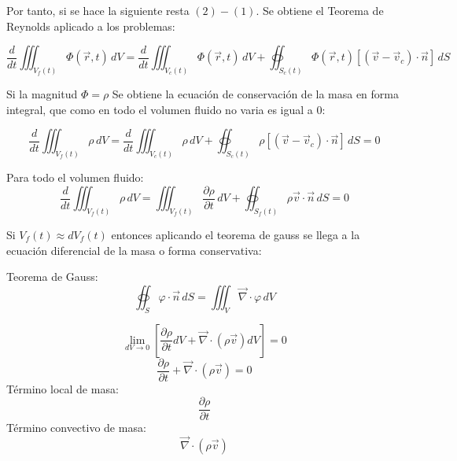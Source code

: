 Por tanto, si se hace la siguiente resta $(2)-(1)$. Se obtiene el Teorema de Reynolds aplicado a los problemas:

\[\frac{d}{dt}\iiint_{V_f(t)}\Phi(\vec{r},t)\,dV=\frac{d}{dt}\iiint_{V_c(t)}\Phi(\vec{r},t)\,dV+\oiint_{S_c(t)} \Phi(\vec{r},t)\left[(\vec{v}-\vec{v}_c)\cdot\vec{n}\right] \,dS\]



Si la magnitud $\Phi = \rho$ Se obtiene la ecuación de conservación de la masa en forma integral, que como en todo el volumen fluido no varia es igual a 0:

\[\frac{d}{dt}\iiint_{V_f(t)}\rho\,dV=\frac{d}{dt}\iiint_{V_c(t)}\rho\,dV+\oiint_{S_c(t)} \rho\left[(\vec{v}-\vec{v}_c)\cdot\vec{n}\right] \,dS=0\]

Para todo el volumen fluido:
\[\frac{d}{dt}\iiint_{V_f(t)} \rho \,dV=\iiint_{V_f(t)} \frac{\partial \rho}{\partial t} \,dV+\oiint_{S_f(t)} \rho\vec{v}\cdot\vec{n} \,dS=0\]

Si $V_f(t)\approx dV_f(t)$ entonces aplicando el teorema de gauss se llega a la ecuación diferencial de la masa o forma conservativa:

Teorema de Gauss:
\[\oiint_S \varphi \cdot \vec{n}\,dS=\iiint_V \vec{\nabla}\cdot\varphi\,dV\]

\[\lim_{dV \to 0}\left[\frac{\partial \rho}{\partial t} dV+\vec{\nabla}\cdot\left(\rho\vec{v}\right)dV\right]=0\]
\[\frac{\partial \rho}{\partial t} +\vec{\nabla}\cdot\left(\rho\vec{v}\right)=0\]
Término local de masa: 
\[\frac{\partial \rho}{\partial t}\]
Término convectivo de masa:
\[\vec{\nabla}\cdot\left(\rho\vec{v}\right)\]
